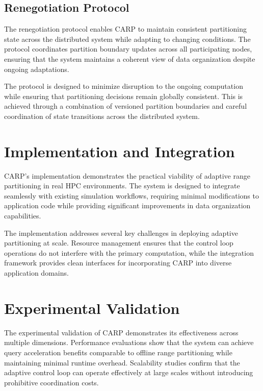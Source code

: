\subsection{Renegotiation Protocol}

The renegotiation protocol enables CARP to maintain consistent partitioning state across the
distributed system while adapting to changing conditions.
The protocol coordinates partition boundary updates across all participating nodes, ensuring that
the system maintains a coherent view of data organization despite ongoing adaptations.

The protocol is designed to minimize disruption to the ongoing computation while ensuring that
partitioning decisions remain globally consistent.
This is achieved through a combination of versioned partition boundaries and careful coordination
of state transitions across the distributed system.

\section{Implementation and Integration}

CARP's implementation demonstrates the practical viability of adaptive range partitioning in real
HPC environments.
The system is designed to integrate seamlessly with existing simulation workflows, requiring
minimal modifications to application code while providing significant improvements in data
organization capabilities.

The implementation addresses several key challenges in deploying adaptive partitioning at scale.
Resource management ensures that the control loop operations do not interfere with the primary
computation, while the integration framework provides clean interfaces for incorporating CARP into
diverse application domains.

\section{Experimental Validation}

The experimental validation of CARP demonstrates its effectiveness across multiple dimensions.
Performance evaluations show that the system can achieve query acceleration benefits comparable to
offline range partitioning while maintaining minimal runtime overhead.
Scalability studies confirm that the adaptive control loop can operate effectively at large scales
without introducing prohibitive coordination costs.

